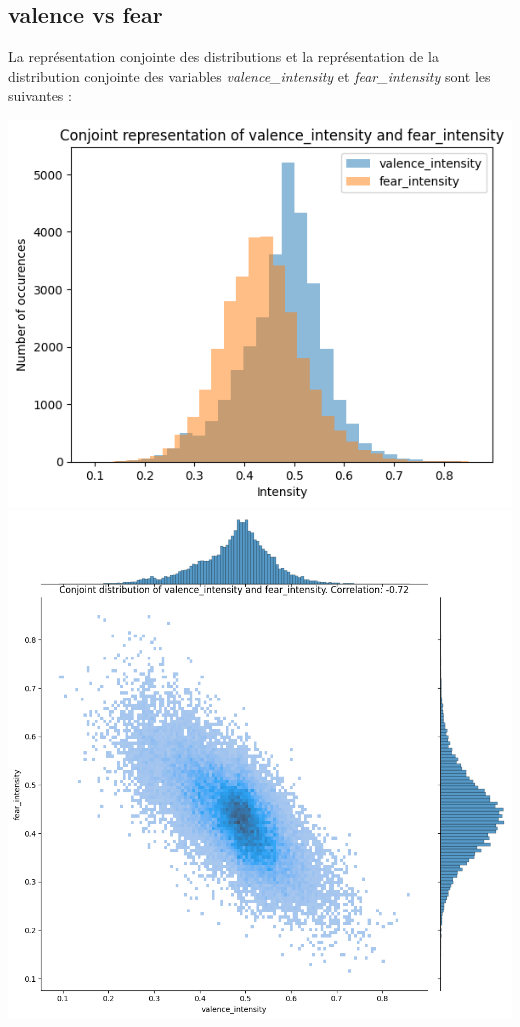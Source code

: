 \documentclass{article}
\begin{document}
\subsection*{valence vs fear}

La représentation conjointe des distributions et la représentation de la
distribution conjointe des variables
\textit{valence\_intensity} et \textit{fear\_intensity}
sont les suivantes :

\begin{center}
    \includegraphics[scale=0.39]{./img/conjoint_representation_valence_intensity_fear_intensity.png}
    \includegraphics[scale=0.23]{./img/conjoint_distribution_valence_intensity_fear_intensity.png}
\end{center}
\end{document}
